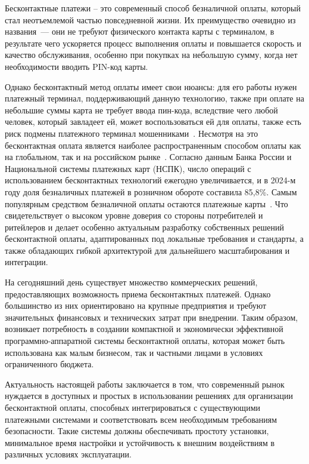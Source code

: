 \newpage


Бесконтактные платежи – это современный способ безналичной оплаты, который стал неотъемлемой частью повседневной жизни.
Их преимущество очевидно из названия~--- они не требуют физического контакта карты с терминалом, в результате чего ускоряется процесс выполнения оплаты и повышается скорость и качество обслуживания, особенно при покупках на небольшую сумму, когда нет необходимости вводить PIN-код карты.

Однако бесконтактный метод оплаты имеет свои нюансы: для его работы нужен платежный терминал, поддерживающий данную технологию, также при оплате на небольшие суммы карта не требует ввода пин-кода, вследствие чего любой человек, который завладеет ей, может воспользоваться ей для оплаты, также есть риск подмены платежного терминал мошенниками~\cite{codejournal}.
Несмотря на это бесконтактная оплата является наиболее распространенным способом оплаты как на глобальном, так и на российском рынке~\cite{posterminals}.
Согласно данным Банка России и Национальной системы платежных карт (НСПК), число операций с использованием бесконтактных технологий ежегодно увеличивается, и в 2024-м году доля безналичных платежей в розничном обороте составила 85,8\%.
Самым популярным средством безналичной оплаты остаются платежные карты~\cite{cdrf_report2024}\cite{cdrf_results2024}.
Что свидетельствует о высоком уровне доверия со стороны потребителей и ритейлеров и делает особенно актуальным разработку собственных решений бесконтактной оплаты, адаптированных под локальные требования и стандарты, а также обладающих гибкой архитектурой для дальнейшего масштабирования и интеграции.

На сегодняшний день существует множество коммерческих решений, предоставляющих возможность приема бесконтактных платежей.
Однако большинство из них ориентировано на крупные предприятия и требуют значительных финансовых и технических затрат при внедрении.
Таким образом, возникает потребность в создании компактной и экономически эффективной программно-аппаратной системы бесконтактной оплаты, которая может быть использована как малым бизнесом, так и частными лицами в условиях ограниченного бюджета.

Актуальность настоящей работы заключается в том, что современный рынок нуждается в доступных и простых в использовании решениях для организации бесконтактной оплаты, способных интегрироваться с существующими платежными системами и соответствовать всем необходимым требованиям безопасности.
Такие системы должны обеспечивать простоту установки, минимальное время настройки и устойчивость к внешним воздействиям в различных условиях эксплуатации.

